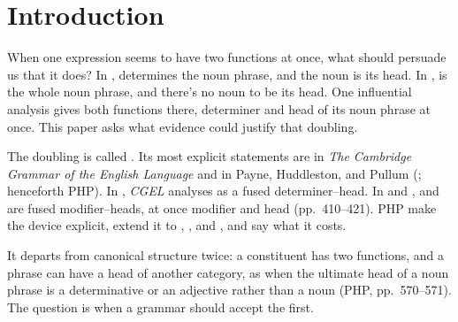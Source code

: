 %

\section{Introduction}\label{sec:intro}

When one expression seems to have two functions at once, what should persuade us that it does? In ,  determines the noun phrase, and the noun  is its head. In ,  is the whole noun phrase, and there's no noun to be its head. One influential analysis gives  both functions there, determiner and head of its noun phrase at once. This paper asks what evidence could justify that doubling.

The doubling is called . Its most explicit statements are in \textit{The Cambridge Grammar of the English Language} \citep[\textit{CGEL};][]{huddleston2002} and in Payne, Huddleston, and Pullum (\citeyear{Payne2007}; henceforth PHP). In , \textit{CGEL} analyses  as a fused determiner--head. In  and ,  and  are fused modifier--heads, at once modifier and head (pp.~410--421). PHP make the device explicit, extend it to , , and , and say what it costs.

It departs from canonical structure twice: a constituent has two functions, and a phrase can have a head of another category, as when the ultimate head of a noun phrase is a determinative or an adjective rather than a noun (PHP, pp.~570--571). The question is when a grammar should accept the first.

